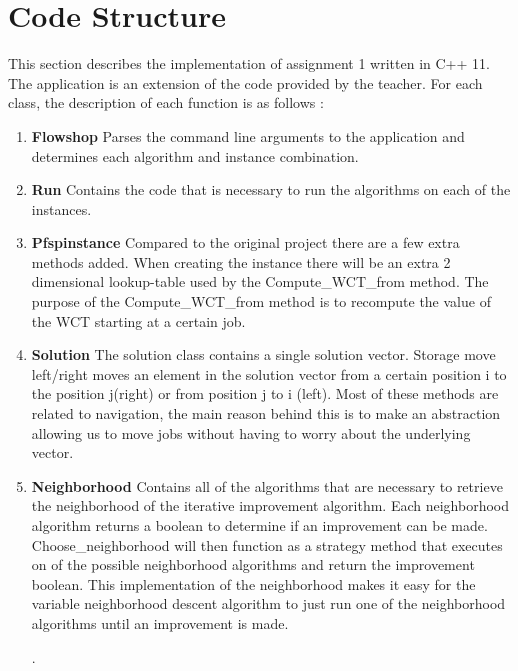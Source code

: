 \documentclass[]{article}
\begin{document}
	\section{Code Structure}
	This section describes the implementation of assignment 1 written in C++ 11.
	The application is an extension of the code provided by the teacher.\newline
	For each class, the description of each function is as follows :
	\begin{enumerate}  
		\item \textbf{Flowshop}\newline
		Parses the command line arguments to the application and determines each algorithm and instance combination.
		
		\item \textbf{Run}\newline
		Contains the code that is necessary to run the algorithms on each of the instances.
		
		
		\item \textbf{Pfspinstance}\newline
		Compared to the original project there are a few extra methods added.
		When creating the instance there will be an extra 2 dimensional lookup-table used by the Compute\_WCT\_from method.
		The purpose of the Compute\_WCT\_from method is to recompute the value of the WCT starting at a certain job.
		
		
		
		
		\item \textbf{Solution}\newline
		The solution class contains a single solution vector.
		Storage move left/right moves an element in the solution vector from a certain position i to the position j(right) or from position j to i (left).
		Most of these methods are related to navigation, the main reason behind this is to make an abstraction allowing us to move jobs without having to worry about the underlying vector.
		
		
		
		
		
		
		
		
		\item \textbf{Neighborhood}\newline
		Contains all of the algorithms that are necessary to retrieve the neighborhood of the iterative improvement algorithm.
		Each neighborhood algorithm returns a boolean to determine if an improvement can be made.
		Choose\_neighborhood will then function as a strategy method that executes on of the possible neighborhood algorithms and return the improvement boolean.
		This implementation of the neighborhood makes it easy for the variable neighborhood descent algorithm to just run one of the neighborhood algorithms until an improvement is made.
		
		
		
		
		
		
		
		
		.
		
		
		
		
		
	\end{enumerate}
	
\end{document}
